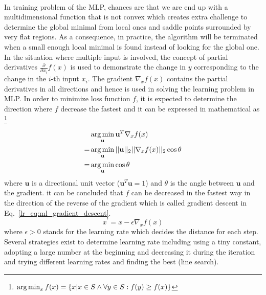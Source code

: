 \paragraph{}
In training problem of the MLP, chances are that we are end up with a multidimensional function that is not convex which creates extra challenge to determine the global minimal from local ones and saddle points surrounded by very flat regions.
As a consequence, in practice, the algorithm will be terminated when a small enough local minimal is found instead of looking for the global one.
In the situation where multiple input is involved, the concept of partial derivatives $\frac{\partial}{\partial x_i}f(x)$ is used to demonstrate the change in $y$ corresponding to the change in the $i$-th input $x_i$.
The gradient $\nabla_x f(x)$ contains the partial derivatives in all directions and hence is used in solving the learning problem in MLP.
In order to minimize loss function $f$, it is expected to determine the direction where $f$ decrease the fastest and it can be expressed in mathematical as \footnote{$\operatorname*{arg\,min}_x f(x) = \left\{
    x | x \in S \wedge \forall y \in S : f(y) \geq f(x)
\right\}$}
\begin{equation}
    \begin{aligned}
    & \operatorname*{arg\,min}_{\mathbf{u}} \mathbf{u}^T \nabla_x f(x)\\
    = & \operatorname*{arg\,min}_{\mathbf{u}} || \mathbf{u} ||_2 ||\nabla_xf(x)||_2 \cos\theta \\
    = & \operatorname*{arg\,min}_{\mathbf{u}} \cos\theta
    \end{aligned}
\end{equation}
%
where $\mathbf{u}$ is a directional unit vector ($\mathbf{u}^T\mathbf{u}=1$) and $\theta$ is the angle between $\mathbf{u}$ and the gradient.
it can be concluded that $f$ can be decreased in the fastest way in the direction of the reverse of the gradient which is called gradient descent in Eq.~\ref{lr_eq:ml_gradient_descent}.
\begin{equation}
    x^\prime = x - \epsilon \nabla_x f(x)
    \label{lr_eq:ml_gradient_descent}
\end{equation}
%
where $\epsilon > 0$ stands for the learning rate which decides the distance for each step.
Several strategies exist to determine learning rate including using a tiny constant, adopting a large number at the beginning and decreasing it during the iteration and trying different learning rates and finding the best (line search).

